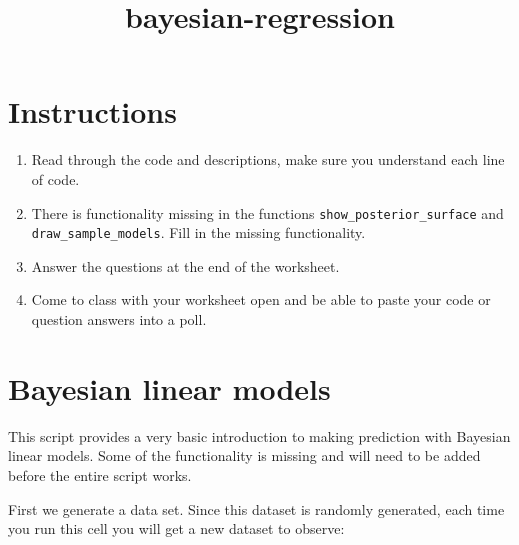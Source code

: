 \documentclass[11pt]{article}
\title{bayesian-regression}
\providecommand{\tightlist}{%
      \setlength{\itemsep}{0pt}\setlength{\parskip}{0pt}}
\begin{document}
    
    
    \maketitle
    
    

    
    \section{Instructions}\label{instructions}

\begin{enumerate}
\def\labelenumi{\arabic{enumi}.}
\tightlist
\item
  Read through the code and descriptions, make sure you understand each
  line of code.
\item
  There is functionality missing in the functions
  \texttt{show\_posterior\_surface} and \texttt{draw\_sample\_models}.
  Fill in the missing functionality.
\item
  Answer the questions at the end of the worksheet.
\item
  Come to class with your worksheet open and be able to paste your code
  or question answers into a poll.
\end{enumerate}

\section{Bayesian linear models}\label{bayesian-linear-models}

This script provides a very basic introduction to making prediction with
Bayesian linear models. Some of the functionality is missing and will
need to be added before the entire script works.

First we generate a data set. Since this dataset is randomly generated,
each time you run this cell you will get a new dataset to observe:
\end{document}
